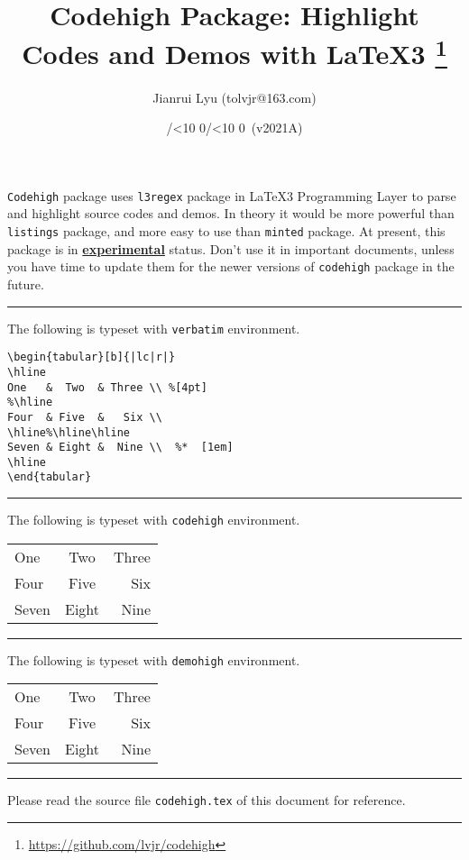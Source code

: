\documentclass{article}
\newcommand*{\myversion}{2021A}
\newcommand*{\mydate}{\the\year/\mylpad\month/\mylpad\day\ (v\myversion)}
\newcommand*{\mylpad}[1]{\ifnum#1<10 0\the#1\else\the#1\fi}
\begin{document}
\title{\textsf{\color{green3}Codehigh Package: Highlight Codes and Demos with LaTeX3}%
       \footnote{\url{https://github.com/lvjr/codehigh}}}
\author{Jianrui Lyu (tolvjr@163.com)}
\date{\mydate}
\maketitle

\verb!Codehigh! package uses \verb!l3regex! package in \LaTeX3 Programming Layer
to parse and highlight source codes and demos.
In theory it would be more powerful than \verb!listings! package,
and more easy to use than \verb!minted! package.
At present, this package is in \underline{\color{red3}\textbf{experimental}} status.
Don’t use it in important documents, unless you have time
to update them for the newer versions of \verb!codehigh! package in the future.

\bigskip
\hrule
\bigskip

The following is typeset with \verb!verbatim! environment.

\begin{verbatim}
\begin{tabular}[b]{|lc|r|}
\hline
One   &  Two  & Three \\ %[4pt]
%\hline
Four  & Five  &   Six \\
\hline%\hline\hline
Seven & Eight &  Nine \\  %*  [1em]
\hline
\end{tabular}
\end{verbatim}

\bigskip
\hrule
\bigskip

The following is typeset with \verb!codehigh! environment.

\begin{codehigh}
\begin{tabular}[b]{|lc|r|}
\hline
One   &  Two  & Three \\ %
Four  & Five  &   Six \\
\hline%
Seven & Eight &  Nine \\  %
\hline
\end{tabular}
\end{codehigh}

\bigskip
\hrule
\bigskip

The following is typeset with \verb!demohigh! environment.

\begin{demohigh}
\begin{tabular}[b]{|lc|r|}
\hline
One   &  Two  & Three \\ %
Four  & Five  &   Six \\
\hline%
Seven & Eight &  Nine \\  %
\hline
\end{tabular}
\end{demohigh}

\bigskip
\hrule
\bigskip

Please read the source file \verb!codehigh.tex! of this document for reference.
\end{document}
